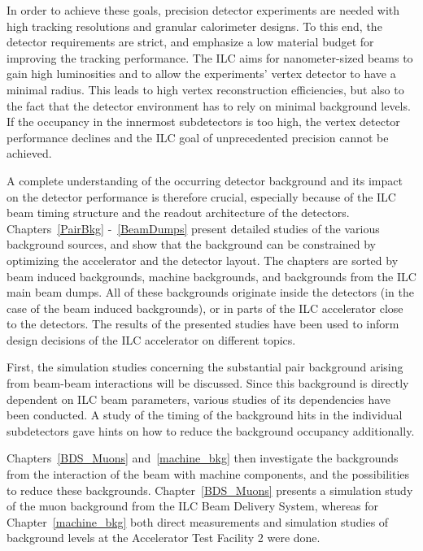 In order to achieve these goals, precision detector experiments are needed with high tracking resolutions and granular calorimeter designs.
To this end, the detector requirements are strict, and emphasize a low material budget for improving the tracking performance.
The ILC aims for nanometer-sized beams to gain high luminosities and to allow the experiments' vertex detector to have a minimal radius.
This leads to high vertex reconstruction efficiencies, but also to the fact that the detector environment has to rely on minimal background levels.
If the occupancy in the innermost subdetectors is too high, the vertex detector performance declines and the ILC goal of unprecedented precision cannot be achieved.

A complete understanding of the occurring detector background and its impact on the detector performance is therefore crucial, especially because of the ILC beam timing structure and the readout architecture of the detectors.
Chapters~\ref{PairBkg} -~\ref{BeamDumps} present detailed studies of the various background sources, and show that the background can be constrained by optimizing the accelerator and the \sid detector layout.
The chapters are sorted by beam induced backgrounds, machine backgrounds, and backgrounds from the ILC main beam dumps.
All of these backgrounds originate inside the detectors (in the case of the beam induced backgrounds), or in parts of the ILC accelerator close to the detectors.
The results of the presented studies have been used to inform design decisions of the ILC accelerator on different topics.

First, the simulation studies concerning the substantial \positron\electron pair background arising from beam-beam interactions will be discussed.
Since this background is directly dependent on ILC beam parameters, various studies of its dependencies have been conducted.
A study of the timing of the background hits in the individual \sid subdetectors gave hints on how to reduce the background occupancy additionally.

Chapters~\ref{BDS_Muons} and~\ref{machine_bkg} then investigate the backgrounds from the interaction of the beam with machine components, and the possibilities to reduce these backgrounds.
Chapter~\ref{BDS_Muons} presents a simulation study of the muon background from the ILC Beam Delivery System, whereas for Chapter~\ref{machine_bkg} both direct measurements and simulation studies of background levels at the Accelerator Test Facility 2 were done. 

